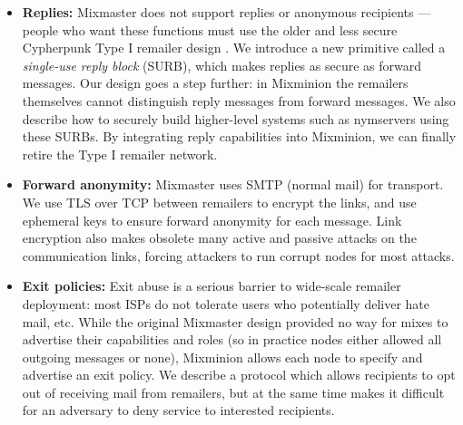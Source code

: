 \documentclass[11pt]{IEEEtran}
\begin{document}
\begin{itemize}
\item \textbf{Replies:} Mixmaster does not support replies or anonymous
recipients --- people who want these functions must use the older and
less secure Cypherpunk Type I remailer design \cite{remailer-history}. We
introduce a new primitive called a \emph{single-use reply block} (SURB),
which makes replies as secure as forward messages. Our design goes a
step further: in Mixminion the remailers themselves cannot distinguish
reply messages from forward messages. We also describe how to securely
build higher-level systems such as nymservers using these SURBs. By
integrating reply capabilities into Mixminion, we can finally retire
the Type I remailer network.

\item \textbf{Forward anonymity:} Mixmaster uses SMTP (normal mail) for
transport. We use TLS over TCP between remailers to encrypt the links,
and use ephemeral keys to ensure forward anonymity for
each message. Link encryption also makes obsolete many active and
passive attacks on the communication links, forcing attackers to run
corrupt nodes for most attacks.


\item \textbf{Exit policies:} Exit abuse is a serious barrier to wide-scale
remailer deployment: most ISPs do not tolerate users who potentially
deliver hate mail, etc. While the original Mixmaster design provided no
way for mixes to advertise their capabilities and roles (so in practice nodes
either allowed all outgoing messages or none), 
Mixminion allows each node to specify and advertise an exit policy. We
describe a protocol which allows recipients to opt out of receiving mail
from remailers, but at the same time makes it difficult for an adversary
to deny service to interested recipients.


\end{itemize}
\end{document}
